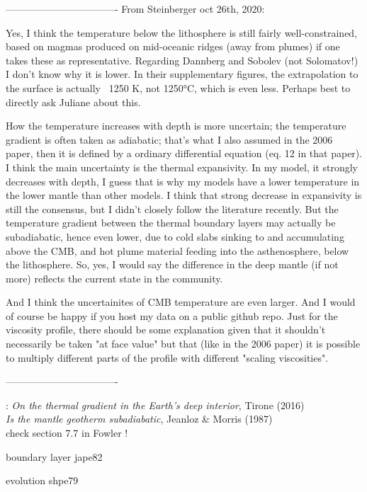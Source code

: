 ----------------------------------
From Steinberger oct 26th, 2020:

Yes, I think the temperature below the lithosphere is still fairly well-constrained, based on magmas produced on mid-oceanic ridges (away from plumes) if one takes these as representative. Regarding Dannberg and Sobolev (not Solomatov!) I don't know why it is lower. In their supplementary figures, the extrapolation to the surface is actually ~1250 K, not 1250°C, which is even less. Perhaps best to directly ask Juliane about this.

How the temperature increases with depth is more uncertain; the temperature gradient is often taken as adiabatic; that's what I also assumed in the 2006 paper, then it is defined by a ordinary differential equation (eq. 12 in that paper). I think the main uncertainty is the thermal expansivity. In my model, it strongly decreases with depth, I guess that is why my models have a lower temperature in the lower mantle than other models. I think that strong decrease in expansivity is still the consensus, but I didn't closely follow the literature recently. But the temperature gradient between the thermal boundary layers may actually be subadiabatic, hence even lower, due to cold slabs sinking to and accumulating above the CMB, and hot plume material feeding into the asthenosphere, below the lithosphere. So, yes, I would say the difference in the deep mantle (if not more) reflects the current state in the community.

And I think the uncertainites of CMB temperature are even larger. And I would of course be happy if you host my data on a public github repo. Just for the viscosity profile, there should be some explanation given that it shouldn't necessarily be taken "at face value" but that (like in the 2006 paper) it is possible to multiply different parts of the profile with different "scaling viscosities".

----------------------------------

\Literature: 
{\it On the thermal gradient in the Earth’s deep interior}, Tirone (2016) \cite{tiro16} \\
{\it Is the mantle geotherm subadiabatic}, Jeanloz \& Morris (1987) \cite{jemo87} \\


check section 7.7 in Fowler !

boundary layer jape82

evolution shpe79
